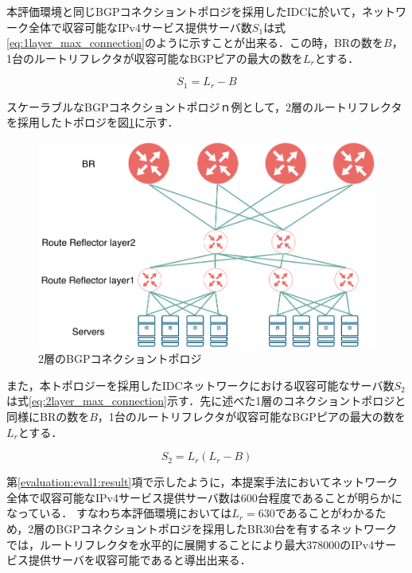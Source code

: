 本評価環境と同じBGPコネクショントポロジを採用したIDCに於いて，ネットワーク全体で収容可能なIPv4サービス提供サーバ数$S_1$は式\ref{eq:1layer_max_connection}のように示すことが出来る．この時，BRの数を$B$，1台のルートリフレクタが収容可能なBGPピアの最大の数を$L_r$とする．

\begin{equation}
    S_1 = L_r - B
    \label{eq:1layer_max_connection}
\end{equation}


スケーラブルなBGPコネクショントポロジｎ例として，2層のルートリフレクタを採用したトポロジを図\ref{fig:2layer_bgp_topology}に示す．


\begin{figure}[h]
    \begin{center}
    \includegraphics[width=12cm,pagebox=cropbox,clip]{img/2layer_bgp_topology.pdf}
    \end{center}
    \caption{2層のBGPコネクショントポロジ}
    \label{fig:2layer_bgp_topology}
\end{figure}


また，本トポロジーを採用したIDCネットワークにおける収容可能なサーバ数$S_2$は式\ref{eq:2layer_max_connection}示す．先に述べた1層のコネクショントポロジと同様にBRの数を$B$，1台のルートリフレクタが収容可能なBGPピアの最大の数を$L_r$とする．


\begin{equation}
    S_2 = L_r(L_r - B)
    \label{eq:2layer_max_connection}
\end{equation}


第\ref{evaluation:eval1:result}項で示したように，本提案手法においてネットワーク全体で収容可能なIPv4サービス提供サーバ数は600台程度であることが明らかになっている．
すなわち本評価環境においては$L_r=630$であることがわかるため，2層のBGPコネクショントポロジを採用したBR30台を有するネットワークでは，ルートリフレクタを水平的に展開することにより最大378000のIPv4サービス提供サーバを収容可能であると導出出来る．



